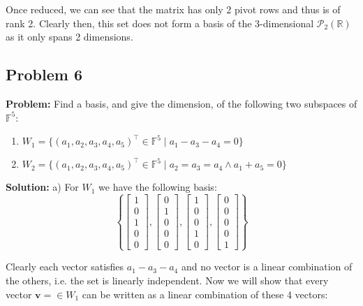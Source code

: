 \documentclass{article}
\renewcommand\vec{\mathbf}
\begin{document}
Once reduced, we can see that the matrix has only 2 pivot rows and thus is of rank 2. Clearly then, this set does not form a basis of the 3-dimensional $\mathcal P_2(\mathbb R)$ as it only spans 2 dimensions.

\subsection*{Problem 6}
\noindent\textbf{Problem:} Find a basis, and give the dimension, of the following two subspaces of $\mathbb F^5$:

\begin{enumerate}[label=\alph*)]
    \item $W_1=\{(a_1,a_2,a_3,a_4,a_5)^\top\in\mathbb F^5\mid a_1-a_3-a_4=0\}$
    \item $W_2=\{(a_1,a_2,a_3,a_4,a_5)^\top\in\mathbb F^5\mid a_2=a_3=a_4\wedge a_1+a_5=0\}$
\end{enumerate}
\bigskip

\noindent\textbf{Solution:} a) For $W_1$ we have the following basis:
$$\left\{\begin{bmatrix}
    1\\0\\1\\0\\0
\end{bmatrix},\begin{bmatrix}
    0\\1\\0\\0\\0
\end{bmatrix},\begin{bmatrix}
    1\\0\\0\\1\\0
\end{bmatrix},\begin{bmatrix}
    0\\0\\0\\0\\1
\end{bmatrix}\right\}$$

Clearly each vector satisfies $a_1-a_3-a_4$ and no vector is a linear combination of the others, i.e. the set is linearly independent. Now we will show that every vector $\vec v=\in W_1$ can be written as a linear combination of these 4 vectors:
\end{document}
